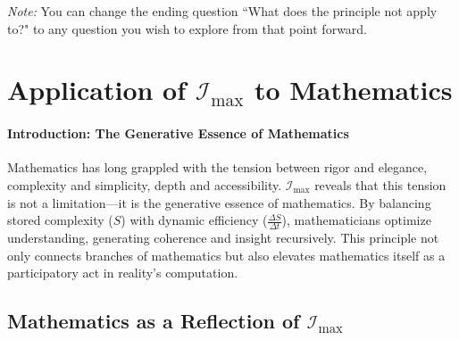 \documentclass[12pt]{article}
\begin{document}
\textit{Note:} You can change the ending question ``What does the principle not apply to?" to any question you wish to explore from that point forward.

\section{Application of \(\mathcal{I}_{\text{max}}\) to Mathematics}

\paragraph{Introduction: The Generative Essence of Mathematics}
Mathematics has long grappled with the tension between rigor and elegance, complexity and simplicity, depth and accessibility. \(\mathcal{I}_{\text{max}}\) reveals that this tension is not a limitation—it is the generative essence of mathematics. By balancing stored complexity (\(S\)) with dynamic efficiency (\(\frac{\Delta S}{\Delta t}\)), mathematicians optimize understanding, generating coherence and insight recursively. This principle not only connects branches of mathematics but also elevates mathematics itself as a participatory act in reality’s computation.

\subsection{Mathematics as a Reflection of \(\mathcal{I}_{\text{max}}\)}
\end{document}
